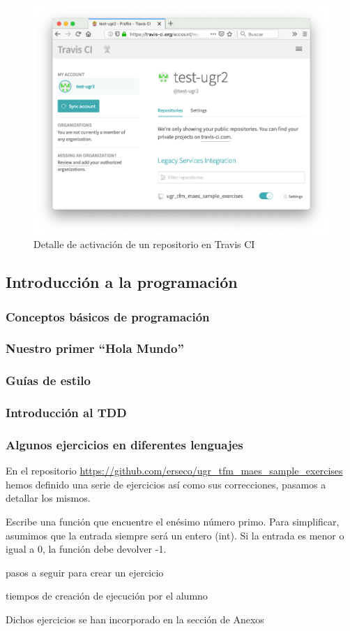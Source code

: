 \begin{figure}[H]
\centering
\includegraphics[width=1.0\textwidth]{../images/travis_enable}
\caption{Detalle de activación de un repositorio en Travis CI}
\label{fig:travis_enable}
\end{figure}

\subsection{Introducción a la programación}

\subsubsection{Conceptos básicos de programación}
\subsubsection{Nuestro primer ``Hola Mundo''}
\subsubsection{Guías de estilo}
\subsubsection{Introducción al TDD}
\subsubsection{Algunos ejercicios en diferentes lenguajes}

En el repositorio \url{https://github.com/erseco/ugr_tfm_maes_sample_exercises} hemos definido una serie de ejercicios así como sus correcciones, pasamos a detallar los mismos.


Escribe una función que encuentre el enésimo número primo. Para simplificar, asumimos que la entrada siempre será un entero (int). Si la entrada es menor o igual a 0, la función debe devolver -1.

pasos a seguir para crear un ejercicio

tiempos de creación de ejecución por el alumno

Dichos ejercicios se han incorporado en la sección de Anexos